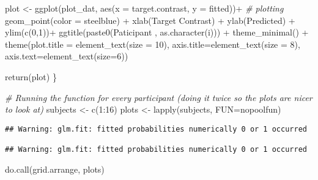 \documentclass[
]{article}
\newenvironment{Shaded}{\begin{snugshade}}{\end{snugshade}}
\newcommand{\AttributeTok}[1]{\textcolor[rgb]{0.77,0.63,0.00}{#1}}
\newcommand{\CommentTok}[1]{\textcolor[rgb]{0.56,0.35,0.01}{\textit{#1}}}
\newcommand{\DecValTok}[1]{\textcolor[rgb]{0.00,0.00,0.81}{#1}}
\newcommand{\FunctionTok}[1]{\textcolor[rgb]{0.00,0.00,0.00}{#1}}
\newcommand{\NormalTok}[1]{#1}
\newcommand{\OtherTok}[1]{\textcolor[rgb]{0.56,0.35,0.01}{#1}}
\newcommand{\SpecialCharTok}[1]{\textcolor[rgb]{0.00,0.00,0.00}{#1}}
\newcommand{\StringTok}[1]{\textcolor[rgb]{0.31,0.60,0.02}{#1}}
\begin{document}
\begin{Shaded}
\begin{Highlighting}[]
\NormalTok{  plot }\OtherTok{\textless{}{-}} \FunctionTok{ggplot}\NormalTok{(plot\_dat, }\FunctionTok{aes}\NormalTok{(}\AttributeTok{x =}\NormalTok{ target.contrast, }\AttributeTok{y =}\NormalTok{ fitted))}\SpecialCharTok{+} \CommentTok{\# plotting}
    \FunctionTok{geom\_point}\NormalTok{(}\AttributeTok{color =} \StringTok{\textquotesingle{}steelblue\textquotesingle{}}\NormalTok{) }\SpecialCharTok{+} 
    \FunctionTok{xlab}\NormalTok{(}\StringTok{\textquotesingle{}Target Contrast\textquotesingle{}}\NormalTok{) }\SpecialCharTok{+}
    \FunctionTok{ylab}\NormalTok{(}\StringTok{\textquotesingle{}Predicted\textquotesingle{}}\NormalTok{) }\SpecialCharTok{+}
    \FunctionTok{ylim}\NormalTok{(}\FunctionTok{c}\NormalTok{(}\DecValTok{0}\NormalTok{,}\DecValTok{1}\NormalTok{))}\SpecialCharTok{+}
    \FunctionTok{ggtitle}\NormalTok{(}\FunctionTok{paste0}\NormalTok{(}\StringTok{\textquotesingle{}Paticipant \textquotesingle{}}\NormalTok{, }\FunctionTok{as.character}\NormalTok{(i))) }\SpecialCharTok{+}
    \FunctionTok{theme\_minimal}\NormalTok{() }\SpecialCharTok{+}
    \FunctionTok{theme}\NormalTok{(}\AttributeTok{plot.title =} \FunctionTok{element\_text}\NormalTok{(}\AttributeTok{size =} \DecValTok{10}\NormalTok{), }\AttributeTok{axis.title=}\FunctionTok{element\_text}\NormalTok{(}\AttributeTok{size =} \DecValTok{8}\NormalTok{), }\AttributeTok{axis.text=}\FunctionTok{element\_text}\NormalTok{(}\AttributeTok{size=}\DecValTok{6}\NormalTok{))}
  
  \FunctionTok{return}\NormalTok{(plot)}
\NormalTok{\}}

\CommentTok{\# Running the function for every participant (doing it twice so the plots are nicer to look at)}
\NormalTok{subjects }\OtherTok{\textless{}{-}} \FunctionTok{c}\NormalTok{(}\DecValTok{1}\SpecialCharTok{:}\DecValTok{16}\NormalTok{)}
\NormalTok{plots }\OtherTok{\textless{}{-}} \FunctionTok{lapply}\NormalTok{(subjects, }\AttributeTok{FUN=}\NormalTok{nopoolfun)}
\end{Highlighting}
\end{Shaded}

\begin{verbatim}
## Warning: glm.fit: fitted probabilities numerically 0 or 1 occurred

## Warning: glm.fit: fitted probabilities numerically 0 or 1 occurred
\end{verbatim}

\begin{Shaded}
\begin{Highlighting}[]
\FunctionTok{do.call}\NormalTok{(grid.arrange,  plots)}
\end{Highlighting}
\end{Shaded}
\end{document}
